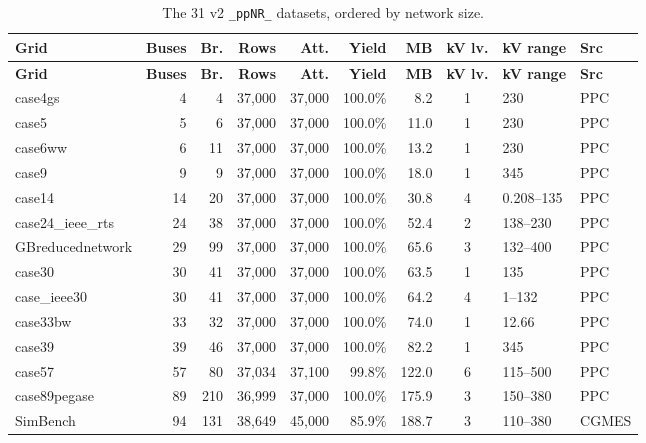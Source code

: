 \documentclass{article}
\begin{document}
{\footnotesize
\setlength{\tabcolsep}{3.5pt}
\begin{longtable}{@{}l r r r r r r c l l@{}}
\caption{The 31 v2 \texttt{\_ppNR\_} datasets, ordered by network size.}
\label{tab:contents}\\
\toprule
\textbf{Grid} & \textbf{Buses} & \textbf{Br.} & \textbf{Rows} & \textbf{Att.} &
\textbf{Yield} & \textbf{MB} & \textbf{kV lv.} & \textbf{kV range} & \textbf{Src} \\
\midrule
\endfirsthead
\toprule
\textbf{Grid} & \textbf{Buses} & \textbf{Br.} & \textbf{Rows} & \textbf{Att.} &
\textbf{Yield} & \textbf{MB} & \textbf{kV lv.} & \textbf{kV range} & \textbf{Src} \\
\midrule
\endhead
case4gs                    & 4 & 4 & 37{,}000 & 37{,}000 & 100.0\% & 8.2 & 1 & 230 & PPC \\
case5                      & 5 & 6 & 37{,}000 & 37{,}000 & 100.0\% & 11.0 & 1 & 230 & PPC \\
case6ww                    & 6 & 11 & 37{,}000 & 37{,}000 & 100.0\% & 13.2 & 1 & 230 & PPC \\
case9                      & 9 & 9 & 37{,}000 & 37{,}000 & 100.0\% & 18.0 & 1 & 345 & PPC \\
case14                     & 14 & 20 & 37{,}000 & 37{,}000 & 100.0\% & 30.8 & 4 & 0.208--135 & PPC \\
case24\_ieee\_rts          & 24 & 38 & 37{,}000 & 37{,}000 & 100.0\% & 52.4 & 2 & 138--230 & PPC \\
GBreducednetwork           & 29 & 99 & 37{,}000 & 37{,}000 & 100.0\% & 65.6 & 3 & 132--400 & PPC \\
case30                     & 30 & 41 & 37{,}000 & 37{,}000 & 100.0\% & 63.5 & 1 & 135 & PPC \\
case\_ieee30               & 30 & 41 & 37{,}000 & 37{,}000 & 100.0\% & 64.2 & 4 & 1--132 & PPC \\
case33bw                   & 33 & 32 & 37{,}000 & 37{,}000 & 100.0\% & 74.0 & 1 & 12.66 & PPC \\
case39                     & 39 & 46 & 37{,}000 & 37{,}000 & 100.0\% & 82.2 & 1 & 345 & PPC \\
case57                     & 57 & 80 & 37{,}034 & 37{,}100 & 99.8\% & 122.0 & 6 & 115--500 & PPC \\
case89pegase               & 89 & 210 & 36{,}999 & 37{,}000 & 100.0\% & 175.9 & 3 & 150--380 & PPC \\
SimBench                   & 94 & 131 & 38{,}649 & 45{,}000 & 85.9\% & 188.7 & 3 & 110--380 & CGMES \\

\end{longtable}}
\end{document}
